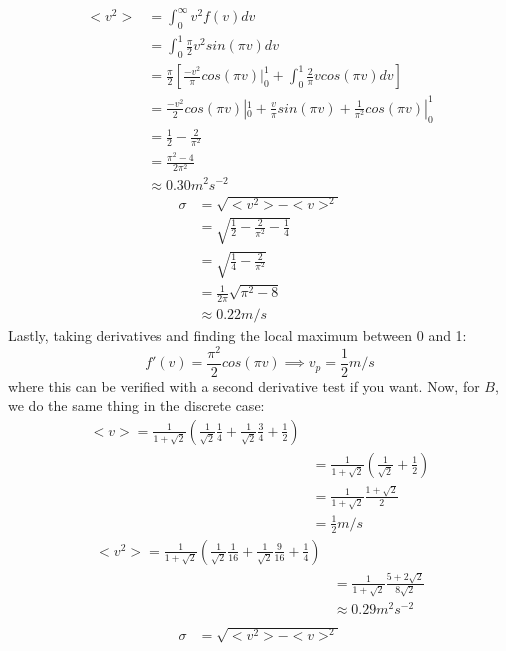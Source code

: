 \documentclass{article}
\begin{document}
\begin{itemize}
\begin{align*}
	\end{align*}
	\begin{align*}
	<v^2> &= \int_0^{\infty} v^2f(v)dv \\
	&= \int_0^1 \frac{\pi}{2}v^2sin(\pi v)dv \\
	&= \frac{\pi}{2}\left[\frac{-v^2}{\pi}cos(\pi v)|_0^1 + \int_0^1\frac{2}{\pi}vcos(\pi v)dv\right] \\
	&= \frac{-v^2}{2}cos(\pi v)|_0^1 + \frac{v}{\pi} sin(\pi v) + \frac{1}{\pi^2}cos(\pi v)|_0^1 \\
	&= \frac{1}{2} - \frac{2}{\pi^2} \\
	&= \frac{\pi^2-4}{2\pi^2} \\
	&\approx 0.30 m^2 s^{-2}
	\end{align*}
	\begin{align*}
	\sigma &= \sqrt{<v^2>-<v>^2} \\
	&= \sqrt{\frac{1}{2}-\frac{2}{\pi^2}-\frac{1}{4}} \\
	&= \sqrt{\frac{1}{4}-\frac{2}{\pi^2}} \\
	&= \frac{1}{2\pi}\sqrt{\pi^2-8} \\
	&\approx 0.22 m/s
	\end{align*}
	Lastly, taking derivatives and finding the local maximum between 0 and 1:
	\begin{equation}
	f'(v) = \frac{\pi^2}{2}cos(\pi v) \implies v_p=\frac{1}{2} m/s
	\end{equation}
	where this can be verified with a second derivative test if you want.
	Now, for $B$, we do the same thing in the discrete case:
	\begin{align*}
	<v> = \frac{1}{1+\sqrt{2}}\left(\frac{1}{\sqrt{2}}\frac{1}{4} + \frac{1}{\sqrt{2}}\frac{3}{4} + \frac{1}{2}\right) \\
	&= \frac{1}{1+\sqrt{2}}\left(\frac{1}{\sqrt{2}}+\frac{1}{2}\right) \\
	&= \frac{1}{1+\sqrt{2}}\frac{1+\sqrt{2}}{2} \\
	&= \frac{1}{2} m/s
	\end{align*}
	\begin{align*}
	<v^2> = \frac{1}{1+\sqrt{2}}\left(\frac{1}{\sqrt{2}}\frac{1}{16} + \frac{1}{\sqrt{2}}\frac{9}{16} + \frac{1}{4}\right) \\
	&= \frac{1}{1+\sqrt{2}}\frac{5+2\sqrt{2}}{8\sqrt{2}} \\
	&\approx 0.29 m^2 s^{-2} \\
	\end{align*}
	\begin{align*}
	\sigma &= \sqrt{<v^2>-<v>^2} \\

\end{align*}
\end{itemize}
\end{document}
